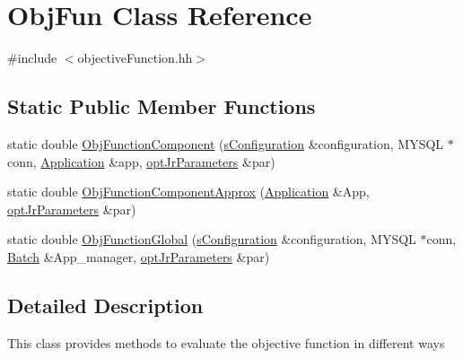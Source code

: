 \hypertarget{classObjFun}{\section{Obj\-Fun Class Reference}
\label{classObjFun}
}


{\ttfamily \#include $<$objective\-Function.\-hh$>$}

\subsection*{Static Public Member Functions}
\begin{DoxyCompactItemize}
\item 
static double \hyperlink{classObjFun_a7c9ecaa07ca776eb64f6e73f84513bc7}{Obj\-Function\-Component} (\hyperlink{readConfigurationFile_8hh_ab8f35b1da3261263c5e9c0e7c8921f5c}{s\-Configuration} \&configuration, M\-Y\-S\-Q\-L $\ast$conn, \hyperlink{classApplication}{Application} \&app, \hyperlink{classoptJrParameters}{opt\-Jr\-Parameters} \&par)
\item 
static double \hyperlink{classObjFun_abb89a994d34b44ec4cb6e0e2562c0107}{Obj\-Function\-Component\-Approx} (\hyperlink{classApplication}{Application} \&App, \hyperlink{classoptJrParameters}{opt\-Jr\-Parameters} \&par)
\item 
static double \hyperlink{classObjFun_ab36af3a1d85dbcaa79dc9b582b00928b}{Obj\-Function\-Global} (\hyperlink{readConfigurationFile_8hh_ab8f35b1da3261263c5e9c0e7c8921f5c}{s\-Configuration} \&configuration, M\-Y\-S\-Q\-L $\ast$conn, \hyperlink{classBatch}{Batch} \&App\-\_\-manager, \hyperlink{classoptJrParameters}{opt\-Jr\-Parameters} \&par)
\end{DoxyCompactItemize}


\subsection{Detailed Description}
This class provides methods to evaluate the objective function in different ways 

